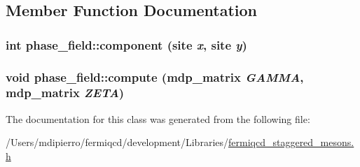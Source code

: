 \subsection{Member Function Documentation}
\hypertarget{classphase__field_aa4837d1dbdef924550e2c473b8cb7cd0}{
\subsubsection[{component}]{\setlength{\rightskip}{0pt plus 5cm}int phase\_\-field::component (site {\em x}, \/  site {\em y})}}
\label{classphase__field_aa4837d1dbdef924550e2c473b8cb7cd0}
\hypertarget{classphase__field_a00ef00d8126c1ce8d68b53d67d217902}{
\subsubsection[{compute}]{\setlength{\rightskip}{0pt plus 5cm}void phase\_\-field::compute ({\bf mdp\_\-matrix} {\em GAMMA}, \/  {\bf mdp\_\-matrix} {\em ZETA})}}
\label{classphase__field_a00ef00d8126c1ce8d68b53d67d217902}


The documentation for this class was generated from the following file:\begin{DoxyCompactItemize}
\item 
/Users/mdipierro/fermiqcd/development/Libraries/\hyperlink{fermiqcd__staggered__mesons_8h}{fermiqcd\_\-staggered\_\-mesons.h}\end{DoxyCompactItemize}
